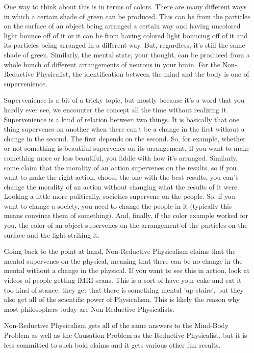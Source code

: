 One way to think about this is in terms of colors. There are many different ways in which a certain shade of green can be produced. This can be from the particles on the surface of an object being arranged a certain way and having uncolored light bounce off of it or it can be from having colored light bouncing off of it and its particles being arranged in a different way. But, regardless, it's still the same shade of green. Similarly, the mental state, your thought, can be produced from a whole bunch of different arrangements of neurons in your brain. For the Non-Reductive Physicalist, the identification between the mind and the body is one of supervenience. 

Supervenience is a bit of a tricky topic, but mostly because it's a word that you hardly ever see, we encounter the concept all the time without realizing it. Supervenience is a kind of relation between two things. It is basically that one thing supervenes on another when there can’t be a change in the first without a change in the second. The first depends on the second. So, for example, whether or not something is beautiful supervenes on its arrangement. If you want to make something more or less beautiful, you fiddle with how it's arranged. Similarly, some claim that the morality of an action supervenes on the results, so if you want to make the right action, choose the one with the best results, you can't change the morality of an action without changing what the results of it were. Looking a little more politically, societies supervene on the people. So, if you want to change a society, you need to change the people in it (typically this means convince them of something). And, finally, if the color example worked for you, the color of an object supervenes on the arrangement of the particles on the surface and the light striking it. 

Going back to the point at hand, Non-Reductive Physicalism claims that the mental supervenes on the physical, meaning that there can be no change in the mental without a change in the physical. If you want to see this in action, look at videos of people getting fMRI scans. This is a sort of have your cake and eat it too kind of stance, they get that there is something mental 'up-stairs', but they also get all of the scientific power of Physicalism. This is likely the reason why most philosophers today are Non-Reductive Physicalists. 

Non-Reductive Physicalism gets all of the same answers to the Mind-Body Problem as well as the Causation Problem as the Reductive Physicalist, but it is less committed to such bold claims and it gets various other fun results. 

